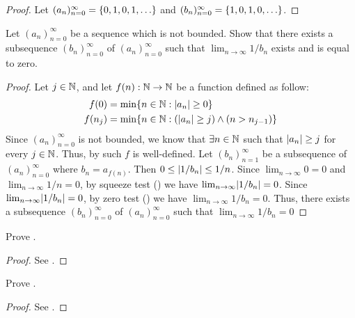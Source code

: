 \begin{proof}
  Let \((a_n)_{n = 0}^\infty = \set{0, 1, 0, 1, \dots}\) and \((b_n)_{n = 0}^\infty = \set{1, 0, 1, 0, \dots}\).
\end{proof}

\begin{ex}\label{i:ex:6.6.3}
  Let \((a_n)_{n = 0}^\infty\) be a sequence which is not bounded.
  Show that there exists a subsequence \((b_n)_{n = 0}^\infty\) of \((a_n)_{n = 0}^\infty\) such that \(\lim_{n \to \infty} 1 / b_n\) exists and is equal to zero.
\end{ex}

\begin{proof}
  Let \(j \in \mathbb{N}\), and let \(f(n) : \mathbb{N} \to \mathbb{N}\) be a function defined as follow:
  \begin{align*}
    f(0)   & = \min\set{n \in \N : \abs{a_n} \geq 0}                         \\
    f(n_j) & = \min\set{n \in \N : (\abs{a_n} \geq j) \land (n > n_{j - 1})}
  \end{align*}
  Since \((a_n)_{n = 0}^\infty\) is not bounded, we know that \(\exists n \in \mathbb{N}\) such that \(\left\lvert a_n\right\rvert \geq j\) for every \(j \in \mathbb{N}\).
  Thus, by  such \(f\) is well-defined.
  Let \((b_n)_{n = 1}^\infty\) be a subsequence of \((a_n)_{n = 0}^\infty\) where \(b_n = a_{f(n)}\).
  Then \(0 \leq \left\lvert1 / b_n\right\rvert \leq 1 / n\).
  Since \(\lim_{n \to \infty} 0 = 0\) and \(\lim_{n \to \infty} 1 / n = 0\), by squeeze test () we have \(\lim_{n \to \infty} \abs{1 / b_n} = 0\).
  Since \(\lim_{n \to \infty} \abs{1 / b_n} = 0\), by zero test () we have \(\lim_{n \to \infty} 1 / b_n = 0\).
  Thus, there exists a subsequence \((b_n)_{n = 0}^\infty\) of \((a_n)_{n = 0}^\infty\) such that \(\lim_{n \to \infty} 1 / b_n = 0\)
\end{proof}

\begin{ex}\label{i:ex:6.6.4}
  Prove .
\end{ex}

\begin{proof}
  See .
\end{proof}

\begin{ex}\label{i:ex:6.6.5}
  Prove .
\end{ex}

\begin{proof}
  See .
\end{proof}
